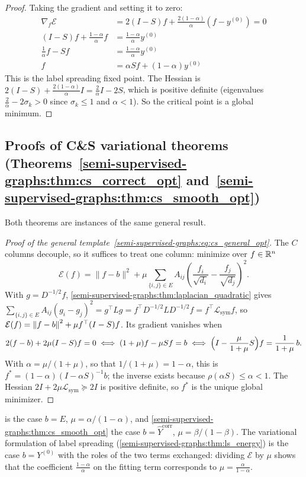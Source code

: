 \begin{notechapter}
\begin{proof}
Taking the gradient and setting it to zero:
\begin{align}
\nabla_f \mathcal{E} &= 2(I - S)f + \frac{2(1-\alpha)}{\alpha}(f - y^{(0)}) = 0\\
(I - S)f + \frac{1-\alpha}{\alpha}f &= \frac{1-\alpha}{\alpha}y^{(0)} \\
\frac{1}{\alpha}f - Sf &= \frac{1-\alpha}{\alpha}y^{(0)} \\
f &= \alpha Sf + (1-\alpha)y^{(0)}
\end{align}
This is the label spreading fixed point. The Hessian is
$2(I - S) + \frac{2(1-\alpha)}{\alpha}I = \frac{2}{\alpha}I - 2S$, which is
positive definite (eigenvalues $\frac{2}{\alpha} - 2\sigma_k > 0$ since
$\sigma_k \leq 1$ and $\alpha < 1$). So the critical point is a global minimum.
\end{proof}

\subsection{Proofs of C\&S variational theorems
  (Theorems~\ref{semi-supervised-graphs:thm:cs_correct_opt} and~\ref{semi-supervised-graphs:thm:cs_smooth_opt})}
\label{semi-supervised-graphs:app:cs_opt}

Both theorems are instances of the same general result.

\begin{proof}[Proof of the general template~\eqref{semi-supervised-graphs:eq:cs_general_opt}]
The $C$ columns decouple, so it suffices to treat one column: minimize over $f \in \mathbb{R}^n$
\[
  \mathcal{E}(f) = \|f - b\|^2 + \mu\sum_{\{i,j\}\in E}A_{ij}
  \left(\frac{f_i}{\sqrt{d_i}} - \frac{f_j}{\sqrt{d_j}}\right)^2 .
\]
With $g = D^{-1/2}f$, \cref{semi-supervised-graphs:thm:laplacian_quadratic} gives $\sum_{\{i,j\}\in E}A_{ij}(g_i - g_j)^2 = g^\top Lg = f^\top D^{-1/2}LD^{-1/2}f = f^\top\mathcal L_{\mathrm{sym}}f$, so $\mathcal E(f) = \left\|f - b\right\|^2 + \mu f^\top(I - S)f$. Its gradient vanishes when
\[
2(f - b) + 2\mu(I - S)f = 0 \iff (1+\mu)f - \mu Sf = b \iff \Bigl(I - \frac{\mu}{1+\mu}S\Bigr)f = \frac{1}{1+\mu}\,b .
\]
With $\alpha = \mu/(1+\mu)$, so that $1/(1+\mu) = 1-\alpha$, this is $f^* = (1-\alpha)(I - \alpha S)^{-1}b$; the inverse exists because $\rho(\alpha S) \le \alpha < 1$. The Hessian $2I + 2\mu\mathcal L_{\mathrm{sym}} \succeq 2I$ is positive definite, so $f^*$ is the unique global minimizer.
\end{proof}

 is the case $b = E$, $\mu = \alpha/(1-\alpha)$, and \cref{semi-supervised-graphs:thm:cs_smooth_opt} the case $b = \hat Y^{\text{corr}}$, $\mu = \beta/(1-\beta)$. The variational formulation of label spreading (\cref{semi-supervised-graphs:thm:ls_energy}) is the case $b = Y^{(0)}$ with the roles of the two terms exchanged: dividing $\mathcal E$ by $\mu$ shows that the coefficient $\frac{1-\alpha}{\alpha}$ on the fitting term corresponds to $\mu = \frac{\alpha}{1-\alpha}$.


\end{notechapter}
